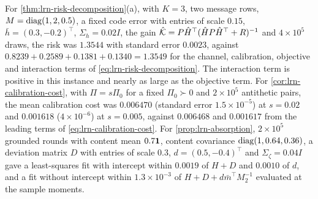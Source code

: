 \begin{numcheck}\label{chk:lrn-decomposition}
For \cref{thm:lrn-risk-decomposition}(a), with $K=3$, two message rows, $M=\operatorname{diag}(1,2,0.5)$, a fixed code error with entries of scale $0.15$, $\bar h=(0.3,-0.2)^\top$, $\Sigma_h=0.02I$, the gain $\hat{\mathcal{K}}=P\hat H^\top(\hat HP\hat H^\top+R)^{-1}$ and $4\times10^5$ draws, the risk was $1.3544$ with standard error $0.0023$, against $0.8239+0.2589+0.1381+0.1340=1.3549$ for the channel, calibration, objective and interaction terms of \cref{eq:lrn-risk-decomposition}. The interaction term is positive in this instance and nearly as large as the objective term. For \cref{cor:lrn-calibration-cost}, with $\Pi=s\Pi_0$ for a fixed $\Pi_0\succ0$ and $2\times10^5$ antithetic pairs, the mean calibration cost was $0.006470$ (standard error $1.5\times10^{-5}$) at $s=0.02$ and $0.001618$ ($4\times10^{-6}$) at $s=0.005$, against $0.006468$ and $0.001617$ from the leading terms of \cref{eq:lrn-calibration-cost}. For \cref{prop:lrn-absorption}, $2\times10^5$ grounded rounds with content mean $0.7\mathbf{1}$, content covariance $\operatorname{diag}(1,0.64,0.36)$, a deviation matrix $D$ with entries of scale $0.3$, $d=(0.5,-0.4)^\top$ and $\Sigma_\zeta=0.04I$ gave a least-squares fit with intercept within $0.0019$ of $H+D$ and $0.0010$ of $d$, and a fit without intercept within $1.3\times10^{-3}$ of $H+D+d\bar m^\top M_2^{-1}$ evaluated at the sample moments.
\end{numcheck}

